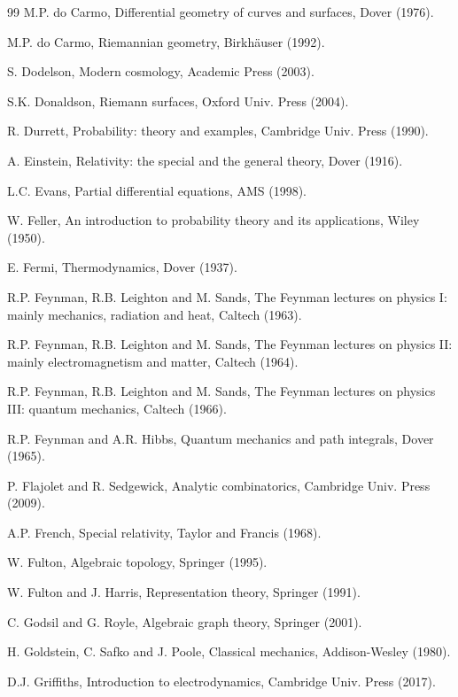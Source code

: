 \documentclass[12pt]{amsbook}
\begin{document}
\begin{thebibliography}{99}
M.P. do Carmo, Differential geometry of curves and surfaces, Dover (1976).

M.P. do Carmo, Riemannian geometry, Birkh\"auser (1992).

S. Dodelson, Modern cosmology, Academic Press (2003).

S.K. Donaldson, Riemann surfaces, Oxford Univ. Press (2004).

R. Durrett, Probability: theory and examples, Cambridge Univ. Press (1990).

A. Einstein, Relativity: the special and the general theory, Dover (1916).

L.C. Evans, Partial differential equations, AMS (1998).

W. Feller, An introduction to probability theory and its applications, Wiley (1950).

E. Fermi, Thermodynamics, Dover (1937). 

R.P. Feynman, R.B. Leighton and M. Sands, The Feynman lectures on physics I: mainly mechanics, radiation and heat, Caltech (1963).

R.P. Feynman, R.B. Leighton and M. Sands, The Feynman lectures on physics II: mainly electromagnetism and matter, Caltech (1964).

R.P. Feynman, R.B. Leighton and M. Sands, The Feynman lectures on physics III: quantum mechanics, Caltech (1966). 

R.P. Feynman and A.R. Hibbs, Quantum mechanics and path integrals, Dover (1965).

P. Flajolet and R. Sedgewick, Analytic combinatorics, Cambridge Univ. Press (2009).

A.P. French, Special relativity, Taylor and Francis (1968). 

W. Fulton, Algebraic topology, Springer (1995).

W. Fulton and J. Harris, Representation theory, Springer (1991).

C. Godsil and G. Royle, Algebraic graph theory, Springer (2001).

H. Goldstein, C. Safko and J. Poole, Classical mechanics, Addison-Wesley (1980).

D.J. Griffiths, Introduction to electrodynamics, Cambridge Univ. Press (2017).


\end{thebibliography}
\end{document}
